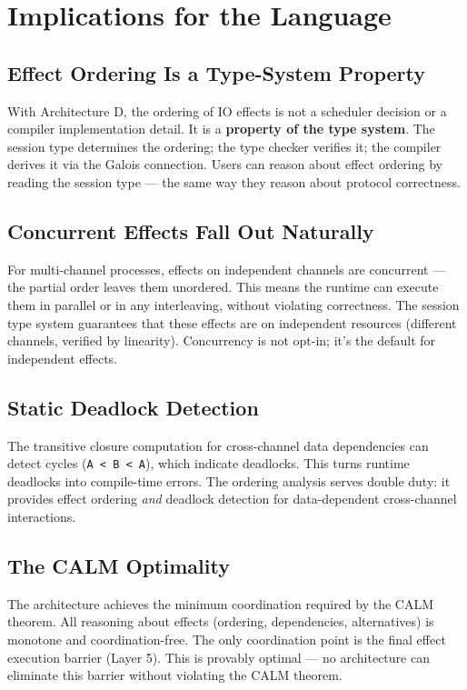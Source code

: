 \documentclass[11pt]{article}
\begin{document}
\section{Implications for the Language}
\label{sec:org4c85e35}

\subsection{Effect Ordering Is a Type-System Property}
\label{sec:org1c3c54c}

With Architecture D, the ordering of IO effects is not a scheduler decision
or a compiler implementation detail. It is a \textbf{property of the type system}.
The session type determines the ordering; the type checker verifies it; the
compiler derives it via the Galois connection. Users can reason about effect
ordering by reading the session type --- the same way they reason about protocol
correctness.
\subsection{Concurrent Effects Fall Out Naturally}
\label{sec:org3258c99}

For multi-channel processes, effects on independent channels are concurrent ---
the partial order leaves them unordered. This means the runtime can execute
them in parallel or in any interleaving, without violating correctness. The
session type system guarantees that these effects are on independent resources
(different channels, verified by linearity). Concurrency is not opt-in; it's
the default for independent effects.
\subsection{Static Deadlock Detection}
\label{sec:org504549f}

The transitive closure computation for cross-channel data dependencies can
detect cycles (\texttt{A < B < A}), which indicate deadlocks. This turns runtime
deadlocks into compile-time errors. The ordering analysis serves double duty:
it provides effect ordering \emph{and} deadlock detection for data-dependent
cross-channel interactions.
\subsection{The CALM Optimality}
\label{sec:org24a4831}

The architecture achieves the minimum coordination required by the CALM theorem.
All reasoning about effects (ordering, dependencies, alternatives) is monotone
and coordination-free. The only coordination point is the final effect execution
barrier (Layer 5). This is provably optimal --- no architecture can eliminate
this barrier without violating the CALM theorem.
\end{document}
